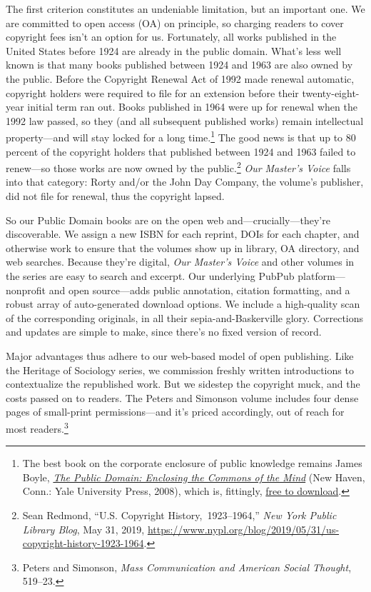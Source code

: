 \documentclass[openany,nobib]{tufte-book}
\begin{document}
\noindent The first criterion constitutes an undeniable limitation, but an
important one. We are committed to open access (OA) on principle, so
charging readers to cover copyright fees isn't an option for us.
Fortunately, all works published in the United States before 1924 are
already in the public domain. What's less well known is that many books
published between 1924 and 1963 are also owned by the public. Before the
Copyright Renewal Act of 1992 made renewal automatic, copyright holders
were required to file for an extension before their twenty-eight-year
initial term ran out. Books published in 1964 were up for renewal when
the 1992 law passed, so they (and all subsequent published works) remain
intellectual property---and will stay locked for a long time.\footnote{The best book on the corporate enclosure of public knowledge remains
  James Boyle, \emph{\href{http://www.worldcat.org/oclc/317471891}{The
  Public Domain: Enclosing the Commons of the Mind}} (New Haven, Conn.:
  Yale University Press, 2008), which is, fittingly,
  \href{http://www.thepublicdomain.org/download/}{free to download}.} The
good news is that up to 80 percent of the copyright holders that
published between 1924 and 1963 failed to renew---so those works are now
owned by the public.\footnote{Sean Redmond, ``U.S. Copyright History,~1923--1964,'' \emph{New York
  Public Library Blog}, May 31, 2019,
  \url{https://www.nypl.org/blog/2019/05/31/us-copyright-history-1923-1964}.} \emph{Our Master's Voice} falls into that
category: Rorty and/or the John Day Company, the volume's publisher, did
not file for renewal, thus the copyright lapsed.

So our Public Domain books are on the open web and---crucially---they're
discoverable. We assign a new ISBN for each reprint, DOIs for each
chapter, and otherwise work to ensure that the volumes show up in
library, OA directory, and web searches. Because they're digital,
\emph{Our Master's Voice} and other volumes in the series are easy to
search and excerpt. Our underlying PubPub platform---nonprofit and open
source---adds public annotation, citation formatting, and a robust array
of auto-generated download options. We include a high-quality scan of
the corresponding originals, in all their sepia-and-Baskerville glory.
Corrections and updates are simple to make, since there's no fixed
version of record.

Major advantages thus adhere to our web-based model of open publishing.
Like the Heritage of Sociology series, we commission freshly written
introductions to contextualize the republished work. But we sidestep the
copyright muck, and the costs passed on to readers. The Peters and
Simonson volume includes four dense pages of small-print
permissions---and it's priced accordingly, out of reach for most
readers.\footnote{Peters and Simonson, \emph{Mass Communication and American Social
  Thought}, 519--23.}
\end{document}
